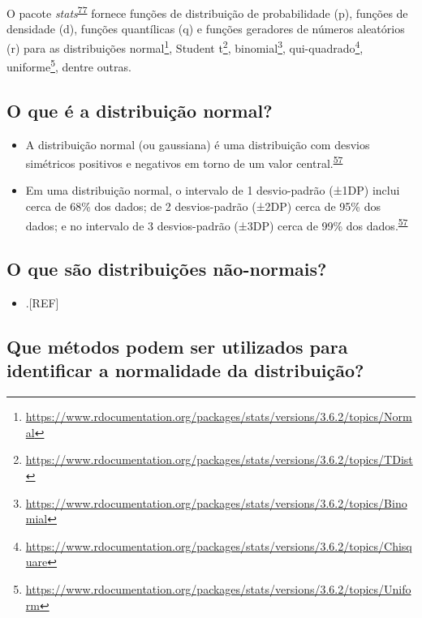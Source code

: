 \documentclass[
  a4paper,
]{book}
\providecommand{\tightlist}{%
  \setlength{\itemsep}{0pt}\setlength{\parskip}{0pt}}
\renewcommand{\href}[2]{#2\footnote{\url{#1}}}
\newenvironment{infobox}[1]
  {
  \begin{itemize}
  \renewcommand{\labelitemi}{
    \raisebox{-.7\height}[0pt][0pt]{
      {\setkeys{Gin}{width=3em,keepaspectratio}
        \texttt{[image: \#1]}}
    }
  }
  \setlength{\fboxsep}{1em}
  \begin{blackbox}
  \item
  }
  {
  \end{blackbox}
  \end{itemize}
  }
\begin{document}
\begin{infobox}{images/Rlogo}
O pacote \emph{stats}\textsuperscript{\protect\hyperlink{ref-stats-3}{77}} fornece funções de distribuição de probabilidade (p), funções de densidade (d), funções quantílicas (q) e funções geradores de números aleatórios (r) para as distribuições \href{https://www.rdocumentation.org/packages/stats/versions/3.6.2/topics/Normal}{normal}, \href{https://www.rdocumentation.org/packages/stats/versions/3.6.2/topics/TDist}{Student t}, \href{https://www.rdocumentation.org/packages/stats/versions/3.6.2/topics/Binomial}{binomial}, \href{https://www.rdocumentation.org/packages/stats/versions/3.6.2/topics/Chisquare}{qui-quadrado}, \href{https://www.rdocumentation.org/packages/stats/versions/3.6.2/topics/Uniform}{uniforme}, dentre outras.

\end{infobox}

\hypertarget{o-que-uxe9-a-distribuiuxe7uxe3o-normal}{%
\subsection{O que é a distribuição normal?}\label{o-que-uxe9-a-distribuiuxe7uxe3o-normal}}

\begin{itemize}
\item
  A distribuição normal (ou gaussiana) é uma distribuição com desvios simétricos positivos e negativos em torno de um valor central.\textsuperscript{\protect\hyperlink{ref-Ali2016}{57}}
\item
  Em uma distribuição normal, o intervalo de 1 desvio-padrão (±1DP) inclui cerca de 68\% dos dados; de 2 desvios-padrão (±2DP) cerca de 95\% dos dados; e no intervalo de 3 desvios-padrão (±3DP) cerca de 99\% dos dados.\textsuperscript{\protect\hyperlink{ref-Ali2016}{57}}
\end{itemize}

\hypertarget{o-que-suxe3o-distribuiuxe7uxf5es-nuxe3o-normais}{%
\subsection{O que são distribuições não-normais?}\label{o-que-suxe3o-distribuiuxe7uxf5es-nuxe3o-normais}}

\begin{itemize}
\tightlist
\item
  .{[}REF{]}
\end{itemize}

\hypertarget{que-muxe9todos-podem-ser-utilizados-para-identificar-a-normalidade-da-distribuiuxe7uxe3o}{%
\subsection{Que métodos podem ser utilizados para identificar a normalidade da distribuição?}\label{que-muxe9todos-podem-ser-utilizados-para-identificar-a-normalidade-da-distribuiuxe7uxe3o}}
\end{document}

